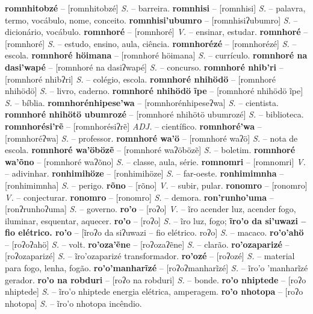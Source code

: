 \textbf{romnhitobzé} -- [romnhitobzé] \textit{S.} -- barreira.
\textbf{romnhisi} -- [romnhisi] \textit{S.} -- palavra, termo, vocábulo, nome, conceito.
\textbf{romnhisi'ubumro} -- [romnhisiʔubumro] \textit{S.} -- dicionário, vocábulo.
\textbf{romnhoré} -- [romnhoré] \textit{V.} -- ensinar, estudar.
\textbf{romnhoré} -- [romnhoré] \textit{S.} -- estudo, ensino, aula, ciência.
\textbf{romnhorézé} -- [romnhorézé] \textit{S.} -- escola.
\textbf{romnhoré höimana} -- [romnhoré höimana] \textit{S.} -- currículo.
\textbf{romnhoré na dasi'wapé} -- [romnhoré na dasiʔwapé] \textit{S.} -- concurso.
\textbf{romnhoré nhib'ri} -- [romnhoré nhibʔri] \textit{S.} -- colégio, escola.
\textbf{romnhoré nhihödö} -- [romnhoré nhihödö] \textit{S.} -- livro, caderno.
\textbf{romnhoré nhihödö ĩpe} -- [romnhoré nhihödö ĩpe] \textit{S.} -- bíblia.
\textbf{romnhorénhipese'wa} -- [romnhorénhipeseʔwa] \textit{S.} -- cientista.
\textbf{romnhoré nhihötö ubumrozé} -- [romnhoré nhihötö ubumrozé] \textit{S.} -- biblioteca.
\textbf{romnhorési'rẽ} -- [romnhorésiʔrẽ] \textit{ADJ.} -- científico.
\textbf{romnhoré'wa} -- [romnhoréʔwa] \textit{S.} -- professor.
\textbf{romnhoré wa'ö} -- [romnhoré waʔö] \textit{S.} -- nota de escola.
\textbf{romnhoré wa'öbözẽ} -- [romnhoré waʔöbözẽ] \textit{S.} -- boletim.
\textbf{romnhoré wa'õno} -- [romnhoré waʔõno] \textit{S.} -- classe, aula, série.
\textbf{romnomri} -- [romnomri] \textit{V.} -- adivinhar.
\textbf{ronhimihöze} -- [ronhimihöze] \textit{S.} -- far-oeste.
\textbf{ronhimimnha} -- [ronhimimnha] \textit{S.} -- perigo.
\textbf{rõno} -- [rõno] \textit{V.} -- subir, pular.
\textbf{ronomro} -- [ronomro] \textit{V.} -- conjecturar.
\textbf{ronomro} -- [ronomro] \textit{S.} -- demora.
\textbf{ron'runho'uma} -- [ronʔrunhoʔuma] \textit{S.} -- governo.
\textbf{ro'o} -- [roʔo] \textit{V.} -- ĩro acender luz, acender fogo, iluminar, esquentar, aquecer.
\textbf{ro'o} -- [roʔo] \textit{S.} -- ĩro luz, fogo;
\textbf{ĩro'o da si'uwazi -- fio elétrico. ro'o} -- [ĩroʔo da siʔuwazi -- fio elétrico. roʔo] \textit{S.} -- macaco.
\textbf{ro'o'ahö} -- [roʔoʔahö] \textit{S.} -- volt.
\textbf{ro'oza'ẽne} -- [roʔozaʔẽne] \textit{S.} -- clarão.
\textbf{ro'ozaparizé} -- [roʔozaparizé] \textit{S.} -- ĩro'ozaparizé transformador.
\textbf{ro'ozé} -- [roʔozé] \textit{S.} -- material para fogo, lenha, fogão.
\textbf{ro'o'manharĩzé} -- [roʔoʔmanharĩzé] \textit{S.} -- ĩro'o 'manharĩzé gerador.
\textbf{ro'o na robduri} -- [roʔo na robduri] \textit{S.} -- bonde.
\textbf{ro'o nhiptede} -- [roʔo nhiptede] \textit{S.} -- ĩro'o nhiptede energia elétrica, amperagem.
\textbf{ro'o nhotopa} -- [roʔo nhotopa] \textit{S.} -- ĩro'o nhotopa incêndio.
